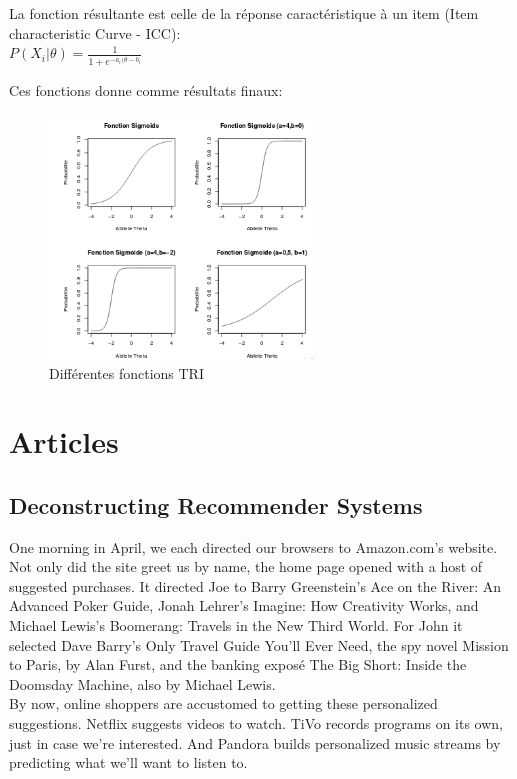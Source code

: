\documentclass[oneside]{book}
\begin{document}
La fonction résultante est celle de la réponse caractéristique à un item (Item characteristic Curve - ICC):\\

\centering
$P(X_i|\theta) = \frac{1}{1 + e^{-a_i(\theta - b_i}}$
\justify

Ces fonctions donne comme résultats finaux:\\

\begin{figure}[!ht]
\centering
\includegraphics[width = 7cm]{tri.png}
\caption{Différentes fonctions TRI}
\label{fig:tri}
\end{figure}

\chapter{Articles}

\section{Deconstructing Recommender Systems}
 One morning in April, we each directed our browsers to Amazon.com’s website. Not only did the site greet us by name, the home page opened with a host of suggested purchases. It directed Joe to Barry Greenstein’s Ace on the River: An Advanced Poker Guide, Jonah Lehrer’s Imagine: How Creativity Works, and Michael Lewis’s Boomerang: Travels in the New Third World. For John it selected Dave Barry’s Only Travel Guide You’ll Ever Need, the spy novel Mission to Paris, by Alan Furst, and the banking exposé The Big Short: Inside the Doomsday Machine, also by Michael Lewis.\\

By now, online shoppers are accustomed to getting these personalized suggestions. Netflix suggests videos to watch. TiVo records programs on its own, just in case we’re interested. And Pandora builds personalized music streams by predicting what we’ll want to listen to.\\
\end{document}
